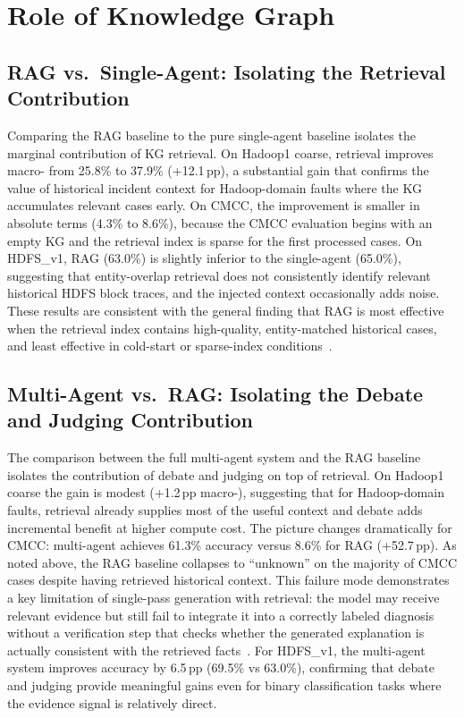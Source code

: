 \section{Role of Knowledge Graph}

\subsection{RAG vs.\ Single-Agent: Isolating the Retrieval Contribution}

Comparing the RAG baseline to the pure single-agent baseline isolates the marginal contribution
of KG retrieval. On Hadoop1 coarse, retrieval improves macro-\fone{} from 25.8\% to 37.9\%
(+12.1\,pp), a substantial gain that confirms the value of historical incident context for
Hadoop-domain faults where the KG accumulates relevant cases early. On CMCC, the improvement is
smaller in absolute terms (4.3\% to 8.6\%), because the CMCC evaluation begins with an empty KG
and the retrieval index is sparse for the first processed cases. On HDFS\_v1, RAG (63.0\%) is
slightly inferior to the single-agent (65.0\%), suggesting that entity-overlap retrieval does not
consistently identify relevant historical HDFS block traces, and the injected context occasionally
adds noise. These results are consistent with the general finding that RAG is most effective when
the retrieval index contains high-quality, entity-matched historical cases, and least effective in
cold-start or sparse-index conditions~\cite{lewis2021retrievalaugmentedgenerationknowledgeintensivenlp,roy2024llmagentRCA}.

\subsection{Multi-Agent vs.\ RAG: Isolating the Debate and Judging Contribution}

The comparison between the full multi-agent system and the RAG baseline isolates the contribution
of debate and judging on top of retrieval. On Hadoop1 coarse the gain is modest (+1.2\,pp
macro-\fone{}), suggesting that for Hadoop-domain faults, retrieval already supplies most of the
useful context and debate adds incremental benefit at higher compute cost. The picture changes
dramatically for CMCC: multi-agent achieves 61.3\% accuracy versus 8.6\% for RAG (+52.7\,pp).
As noted above, the RAG baseline collapses to ``unknown'' on the majority of CMCC cases despite
having retrieved historical context. This failure mode demonstrates a key limitation of single-pass
generation with retrieval: the model may receive relevant evidence but still fail to integrate it
into a correctly labeled diagnosis without a verification step that checks whether the generated
explanation is actually consistent with the retrieved facts~\cite{roy2024llmagentRCA,cui2025aetherlog}.
For HDFS\_v1, the multi-agent system improves accuracy by 6.5\,pp (69.5\% vs 63.0\%), confirming
that debate and judging provide meaningful gains even for binary classification tasks where the
evidence signal is relatively direct.


